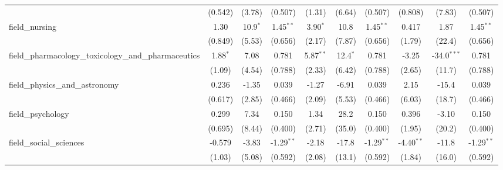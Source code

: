 \begin{tabular}{lccccccccc}
                                                               & (0.542)       & (3.78)        & (0.507)       & (1.31)        & (6.64)         & (0.507)       & (0.808)       & (7.83)        & (0.507)\\   
   field\_nursing                                              & 1.30          & 10.9$^{*}$    & 1.45$^{**}$   & 3.90$^{*}$    & 10.8           & 1.45$^{**}$   & 0.417         & 1.87          & 1.45$^{**}$\\   
                                                               & (0.849)       & (5.53)        & (0.656)       & (2.17)        & (7.87)         & (0.656)       & (1.79)        & (22.4)        & (0.656)\\   
   field\_pharmacology\_toxicology\_and\_pharmaceutics         & 1.88$^{*}$    & 7.08          & 0.781         & 5.87$^{**}$   & 12.4$^{*}$     & 0.781         & -3.25         & -34.0$^{***}$ & 0.781\\   
                                                               & (1.09)        & (4.54)        & (0.788)       & (2.33)        & (6.42)         & (0.788)       & (2.65)        & (11.7)        & (0.788)\\   
   field\_physics\_and\_astronomy                              & 0.236         & -1.35         & 0.039         & -1.27         & -6.91          & 0.039         & 2.15          & -15.4         & 0.039\\   
                                                               & (0.617)       & (2.85)        & (0.466)       & (2.09)        & (5.53)         & (0.466)       & (6.03)        & (18.7)        & (0.466)\\   
   field\_psychology                                           & 0.299         & 7.34          & 0.150         & 1.34          & 28.2           & 0.150         & 0.396         & -3.10         & 0.150\\   
                                                               & (0.695)       & (8.44)        & (0.400)       & (2.71)        & (35.0)         & (0.400)       & (1.95)        & (20.2)        & (0.400)\\   
   field\_social\_sciences                                     & -0.579        & -3.83         & -1.29$^{**}$  & -2.18         & -17.8          & -1.29$^{**}$  & -4.40$^{**}$  & -11.8         & -1.29$^{**}$\\   
                                                               & (1.03)        & (5.08)        & (0.592)       & (2.08)        & (13.1)         & (0.592)       & (1.84)        & (16.0)        & (0.592)\\   

\end{tabular}
